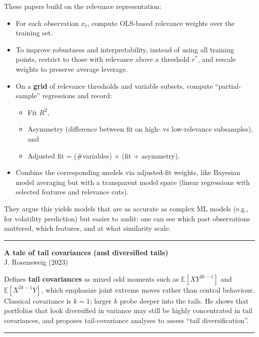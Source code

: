 \documentclass[a5paper]{article}
\providecommand{\tightlist}{%
  \setlength{\itemsep}{0pt}\setlength{\parskip}{0pt}}
\begin{document}
These papers build on the relevance representation:

\begin{itemize}
\item
  For each observation $x_t$, compute OLS-based relevance weights over
  the training set.
\item
  To improve robustness and interpretability, instead of using all
  training points, restrict to those with relevance above a threshold
  $r^*$, and rescale weights to preserve average leverage.
\item
  On a \textbf{grid} of relevance thresholds and variable subsets,
  compute ``partial-sample'' regressions and record:

  \begin{itemize}
  \tightlist
  \item
    Fit $R^2$,
  \item
    Asymmetry (difference between fit on high- vs low-relevance
    subsamples), and
  \item
    Adjusted fit = (\#variables) $\times$ (fit + asymmetry).
  \end{itemize}
\item
  Combine the corresponding models via adjusted-fit weights, like
  Bayesian model averaging but with a transparent model space (linear
  regressions with selected features and relevance cuts).
\end{itemize}

They argue this yields models that are as accurate as complex ML models
(e.g., for volatility prediction) but easier to audit: one can see which
past observations mattered, which features, and at what similarity
scale.

\begin{center}\rule{0.5\linewidth}{0.5pt}\end{center}

\textbf{A tale of tail covariances (and diversified tails)}\\
J. Rosensweig (2023)

Defines \textbf{tail covariances} as mixed odd moments such as
$\mathbb{E}[XY^{2k-1}]$ and $\mathbb{E}[X^{2k-1}Y]$,
which emphasize joint extreme moves rather than central behaviour.
Classical covariance is $k=1$; larger $k$ probe deeper into the tails. He
shows that portfolios that look diversified in variance may still be
highly concentrated in tail covariances, and proposes tail-covariance
analyses to assess ``tail diversification''.

\begin{center}\rule{0.5\linewidth}{0.5pt}\end{center}
\end{document}
